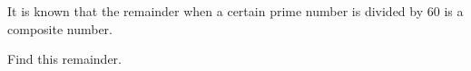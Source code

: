 It is known that the remainder when a certain prime number is divided by $60$ is a composite number.

Find this remainder.
